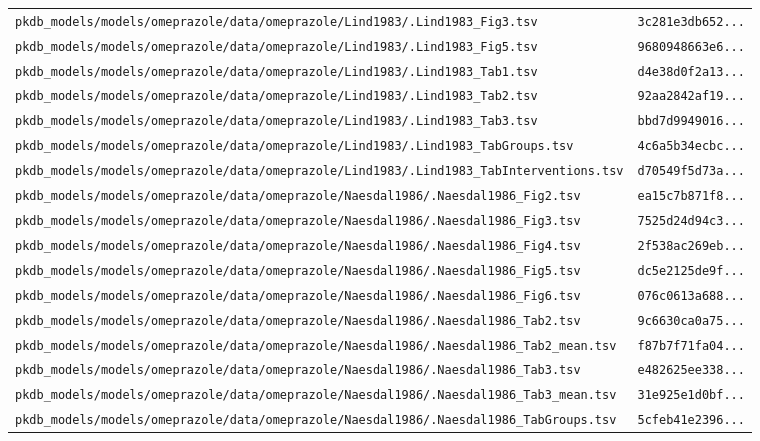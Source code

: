 \begin{longtable}{ll}
\texttt{pkdb\_models/models/omeprazole/data/omeprazole/Lind1983/.Lind1983\_Fig3.tsv} & \texttt{3c281e3db652...} \\
\texttt{pkdb\_models/models/omeprazole/data/omeprazole/Lind1983/.Lind1983\_Fig5.tsv} & \texttt{9680948663e6...} \\
\texttt{pkdb\_models/models/omeprazole/data/omeprazole/Lind1983/.Lind1983\_Tab1.tsv} & \texttt{d4e38d0f2a13...} \\
\texttt{pkdb\_models/models/omeprazole/data/omeprazole/Lind1983/.Lind1983\_Tab2.tsv} & \texttt{92aa2842af19...} \\
\texttt{pkdb\_models/models/omeprazole/data/omeprazole/Lind1983/.Lind1983\_Tab3.tsv} & \texttt{bbd7d9949016...} \\
\texttt{pkdb\_models/models/omeprazole/data/omeprazole/Lind1983/.Lind1983\_TabGroups.tsv} & \texttt{4c6a5b34ecbc...} \\
\texttt{pkdb\_models/models/omeprazole/data/omeprazole/Lind1983/.Lind1983\_TabInterventions.tsv} & \texttt{d70549f5d73a...} \\
\texttt{pkdb\_models/models/omeprazole/data/omeprazole/Naesdal1986/.Naesdal1986\_Fig2.tsv} & \texttt{ea15c7b871f8...} \\
\texttt{pkdb\_models/models/omeprazole/data/omeprazole/Naesdal1986/.Naesdal1986\_Fig3.tsv} & \texttt{7525d24d94c3...} \\
\texttt{pkdb\_models/models/omeprazole/data/omeprazole/Naesdal1986/.Naesdal1986\_Fig4.tsv} & \texttt{2f538ac269eb...} \\
\texttt{pkdb\_models/models/omeprazole/data/omeprazole/Naesdal1986/.Naesdal1986\_Fig5.tsv} & \texttt{dc5e2125de9f...} \\
\texttt{pkdb\_models/models/omeprazole/data/omeprazole/Naesdal1986/.Naesdal1986\_Fig6.tsv} & \texttt{076c0613a688...} \\
\texttt{pkdb\_models/models/omeprazole/data/omeprazole/Naesdal1986/.Naesdal1986\_Tab2.tsv} & \texttt{9c6630ca0a75...} \\
\texttt{pkdb\_models/models/omeprazole/data/omeprazole/Naesdal1986/.Naesdal1986\_Tab2\_mean.tsv} & \texttt{f87b7f71fa04...} \\
\texttt{pkdb\_models/models/omeprazole/data/omeprazole/Naesdal1986/.Naesdal1986\_Tab3.tsv} & \texttt{e482625ee338...} \\
\texttt{pkdb\_models/models/omeprazole/data/omeprazole/Naesdal1986/.Naesdal1986\_Tab3\_mean.tsv} & \texttt{31e925e1d0bf...} \\
\texttt{pkdb\_models/models/omeprazole/data/omeprazole/Naesdal1986/.Naesdal1986\_TabGroups.tsv} & \texttt{5cfeb41e2396...} \\

\end{longtable}
